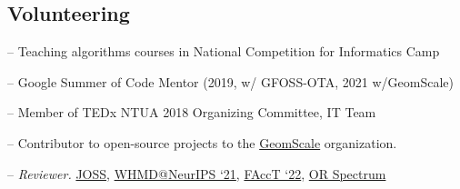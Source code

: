 \documentclass[margin]{res}
\begin{document}
\begin{resume}
\section{Volunteering} 
\begin{compactitem}
    \item[--] Teaching algorithms courses in National Competition for Informatics Camp 
    \item[--] Google Summer of Code Mentor (2019, w/ GFOSS-OTA, 2021 w/GeomScale)
    \item[--] Member of TEDx NTUA 2018 Organizing Committee, IT Team 
    \item[--] Contributor to open-source projects to the \href{https://geomscale.github.io/}{GeomScale} organization.
    \item [--] \emph{Reviewer.} \href{https://joss.theoj.org/}{JOSS}, \href{https://sites.google.com/view/whmd2021}{WHMD@NeurIPS `21}, \href{https://facctconference.org/2022}{FAccT `22}, \href{https://www.springer.com/journal/291?gclid=Cj0KCQiAr5iQBhCsARIsAPcwROPwkZ2Nw4Ubg7i91Y2hITU4OE4lzk_56F09IS09b5wh-sMhuqgft0YaAgATEALw_wcB}{OR Spectrum}

\end{compactitem}





\end{resume}
\end{document}
